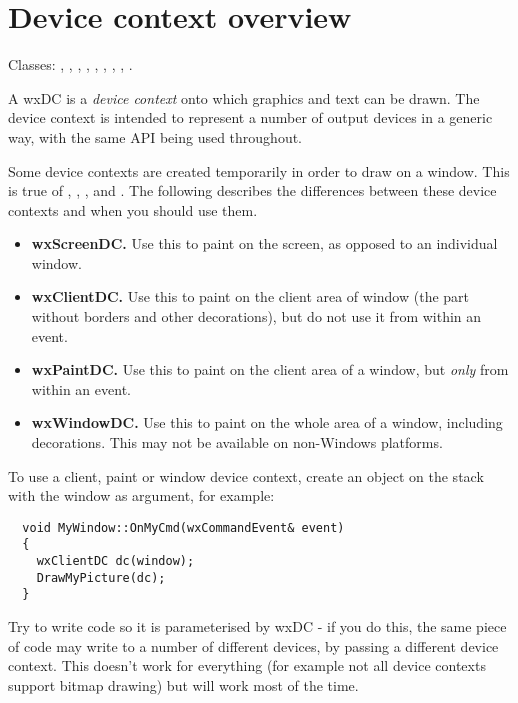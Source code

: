 \section{Device context overview}\label{dcoverview}

Classes: , ,\rtfsp
\rtfsp{}, , ,\rtfsp
{}, , ,\rtfsp
{}.

A wxDC is a {\it device context} onto which graphics and text can be drawn.
The device context is intended to represent a number of output devices in a generic way,
with the same API being used throughout.

Some device contexts are created temporarily in order to draw on a window.
This is true of , , ,
and . The following describes the differences between
these device contexts and when you should use them.

\begin{itemize}\itemsep=0pt
\item {\bf wxScreenDC.} Use this to paint on the screen, as opposed to an individual window.
\item {\bf wxClientDC.} Use this to paint on the client area of window (the part without
borders and other decorations), but do not use it from within an  event.
\item {\bf wxPaintDC.} Use this to paint on the client area of a window, but {\it only} from
within an  event.
\item {\bf wxWindowDC.} Use this to paint on the whole area of a window, including decorations.
This may not be available on non-Windows platforms.
\end{itemize}

To use a client, paint or window device context, create an object on the stack with
the window as argument, for example:

\begin{verbatim}
  void MyWindow::OnMyCmd(wxCommandEvent& event)
  {
    wxClientDC dc(window);
    DrawMyPicture(dc);
  }
\end{verbatim}

Try to write code so it is parameterised by wxDC - if you do this, the same piece of code may
write to a number of different devices, by passing a different device context. This doesn't
work for everything (for example not all device contexts support bitmap drawing) but
will work most of the time.

